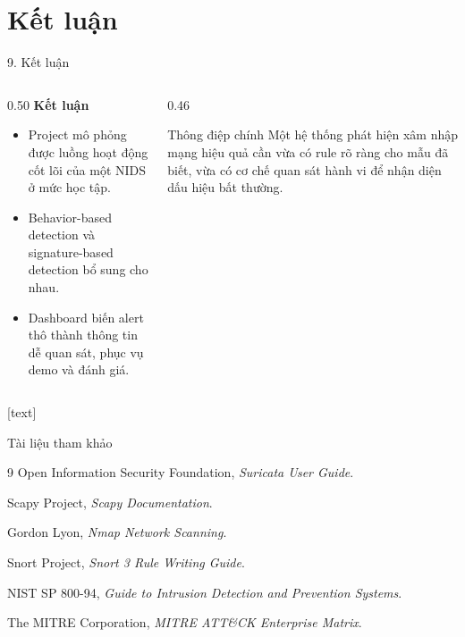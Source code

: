 \documentclass[t, aspectratio=169]{beamer}
\begin{document}
\section{Kết luận}

\begin{frame}{9. Kết luận}
    \begin{columns}[T,onlytextwidth]
        \begin{column}{0.50\textwidth}
            \textbf{Kết luận}
            \begin{itemize}
                \item Project mô phỏng được luồng hoạt động cốt lõi của một NIDS ở mức học tập.
                \item Behavior-based detection và signature-based detection bổ sung cho nhau.
                \item Dashboard biến alert thô thành thông tin dễ quan sát, phục vụ demo và đánh giá.
            \end{itemize}
        \end{column}
        \begin{column}{0.46\textwidth}
            \begin{block}{Thông điệp chính}
                Một hệ thống phát hiện xâm nhập mạng hiệu quả cần vừa có rule rõ ràng cho mẫu đã biết, vừa có cơ chế quan sát hành vi để nhận diện dấu hiệu bất thường.
            \end{block}
        \end{column}
    \end{columns}
\end{frame}

\useStyleLogoOnly
{}[text]
\begin{frame}{Tài liệu tham khảo}
    \begin{thebibliography}{9}
        Open Information Security Foundation, \emph{Suricata User Guide}.

        Scapy Project, \emph{Scapy Documentation}.

        Gordon Lyon, \emph{Nmap Network Scanning}.

        Snort Project, \emph{Snort 3 Rule Writing Guide}.

        NIST SP 800-94, \emph{Guide to Intrusion Detection and Prevention Systems}.

        The MITRE Corporation, \emph{MITRE ATT\&CK Enterprise Matrix}.
    \end{thebibliography}
\end{frame}
\end{document}
